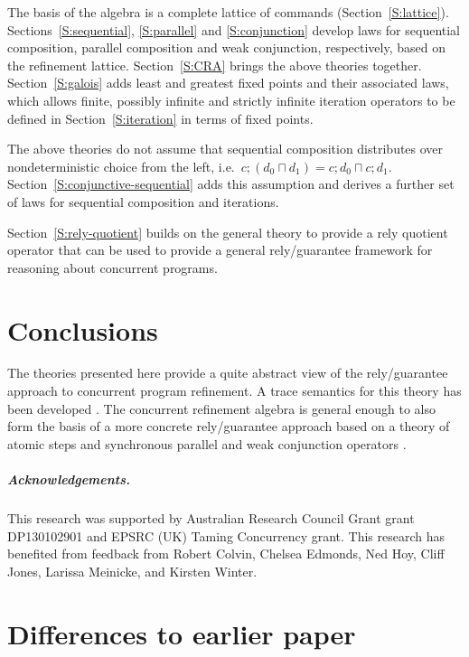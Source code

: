 \documentclass[12pt,a4paper]{article}
\newcommand{\nondet}{\mathbin{\sqcap}}
\newcommand{\nondet}{\mathbin{\sqcup}}
\newcommand{\Seq}{\mathbin{;}}
\begin{document}
The basis of the algebra is a complete lattice of commands (Section~\ref{S:lattice}).
Sections~\ref{S:sequential}, \ref{S:parallel} and \ref{S:conjunction} 
develop laws for sequential composition, parallel composition and weak conjunction,
respectively, based on the refinement lattice.
Section~\ref{S:CRA} brings the above theories together.
Section~\ref{S:galois} adds least and greatest fixed points and their associated laws,
which allows finite, possibly infinite and strictly infinite iteration operators to
be defined in Section~\ref{S:iteration} in terms of fixed points.

The above theories do not assume 
that sequential composition distributes over nondeterministic choice from the left,
i.e.\ $c \Seq (d_0 \nondet d_1) = c \Seq d_0 \nondet c \Seq d_1$.
Section~\ref{S:conjunctive-sequential} adds this assumption and derives a further
set of laws for sequential composition and iterations.

Section~\ref{S:rely-quotient} builds on the general theory to provide a rely quotient
operator that can be used to provide a general rely/guarantee framework for 
reasoning about concurrent programs.



\section{Conclusions}

The theories presented here provide a quite abstract view of the rely/guarantee approach
to concurrent program refinement.
A trace semantics for this theory has been developed \cite{DaSMfaWSLwC}.
The concurrent refinement algebra is general enough to also form the basis of a
more concrete rely/guarantee approach based on a theory of atomic steps and
synchronous parallel and weak conjunction operators \cite{FM2016atomicSteps}.

\subparagraph*{Acknowledgements.}

This research was supported by
Australian Research Council Grant grant
DP130102901
and
EPSRC (UK) Taming Concurrency grant.
This research has benefited from feedback from
Robert Colvin,
Chelsea Edmonds,
Ned Hoy,
Cliff Jones,
Larissa Meinicke,
and
Kirsten Winter.

\appendix
\section{Differences to earlier paper}\label{diffs}
\end{document}
